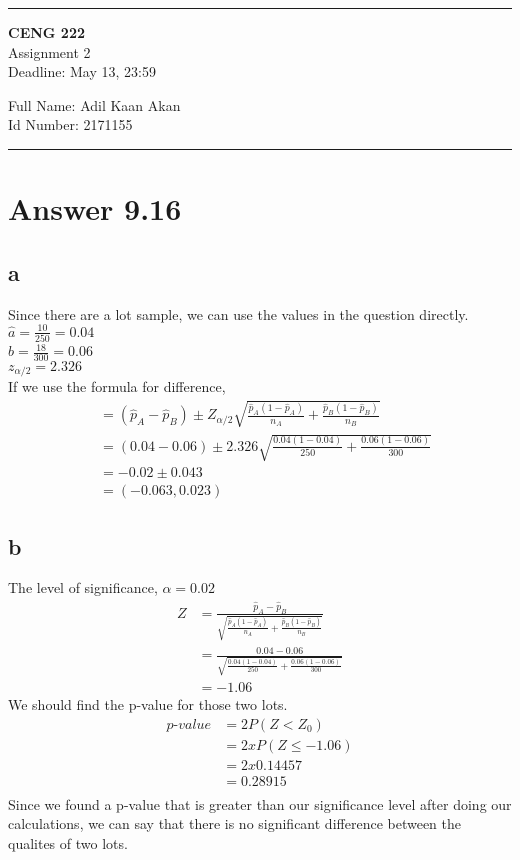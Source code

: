 \documentclass[11pt]{article}
\newcommand{\HRule}{\rule{\linewidth}{1mm}}
\begin{document}
\noindent
\HRule
\begin{center}
\Large 
\textbf{CENG 222}  \\
\normalsize 
Assignment 2 \\
Deadline: May 13, 23:59 \\
\end{center}
\begin{flushleft}
\normalsize 
	Full Name: Adil Kaan Akan\\
	Id Number: 2171155
\end{flushleft}
\HRule

\section*{Answer 9.16}
\subsection*{a}
Since there are a lot sample, we can use the values in the question directly.\\
$\hat{a} = \frac{10}{250}= 0.04$\\
$\hat{b} = \frac{18}{300} = 0.06$ \\
$z_{\alpha/2} = 2.326$ \\
If we use the formula for difference,\\
\begin{align*}
& =  (\hat{p}_A - \hat{p}_B) \pm Z_{\alpha/2}\sqrt{\frac{\hat{p}_A (1-\hat{p}_A)}{n_A} + \frac{\hat{p}_B (1-\hat{p}_B)}{n_B}} \\
&= (0.04 - 0.06) \pm 2.326\sqrt{ \frac{0.04(1-0.04)}{250} + \frac{0.06(1-0.06)}{300}}\\
&= -0.02 \pm 0.043\\
&=(-0.063,0.023)
\end{align*}
\subsection*{b}
The level of significance, $\alpha = 0.02$ \\
\begin{align*}
Z &= \frac{\hat{p}_A - \hat{p}_B}{\sqrt{\frac{\hat{p}_A (1-\hat{p}_A)}{n_A} + \frac{\hat{p}_B (1-\hat{p}_B)}{n_B}}} \\
&= \frac{0.04 - 0.06}{\sqrt{ \frac{0.04(1-0.04)}{250} + \frac{0.06(1-0.06)}{300}}} \\
&= -1.06
\end{align*}
We should find the p-value for those two lots. \\
\begin{align*}
\textit{p-value} &= 2P(Z < Z_0) \\
&= 2x P (Z \leq -1.06) \\
&= 2 x 0.14457 \\
&= 0.28915 \\
\end{align*}
Since we found a p-value that is greater than our significance level after doing our calculations, we can say that there is no significant difference between the qualites of two lots.
\end{document}
